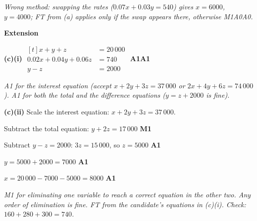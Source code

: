 \documentclass[12pt, twoside]{article}
\begin{document}
\begin{enumerate}[itemsep=0.3cm]
\emph{Wrong method: swapping the rates ($0.07x + 0.03y = 540$) gives
$x = 6000$, $y = 4000$; FT from (a) applies only if the swap appears
there, otherwise M1A0A0.}

\textbf{Extension}

\textbf{(c)(i)} \quad
$\begin{aligned}[t]
x + y + z &= 20\,000 \\
0.02x + 0.04y + 0.06z &= 740 \\
y - z &= 2000
\end{aligned}$
\hfill \textbf{A1A1}

\emph{A1 for the interest equation (accept $x + 2y + 3z = 37\,000$ or
$2x + 4y + 6z = 74\,000$). A1 for both the total and the difference
equations ($y = z + 2000$ is fine).}

\textbf{(c)(ii)} Scale the interest equation: $x + 2y + 3z = 37\,000$.

Subtract the total equation: $y + 2z = 17\,000$ \hfill \textbf{M1}

Subtract $y - z = 2000$: $3z = 15\,000$, so $z = 5000$ \hfill \textbf{A1}

$y = 5000 + 2000 = 7000$ \hfill \textbf{A1}

$x = 20\,000 - 7000 - 5000 = 8000$ \hfill \textbf{A1}

\emph{M1 for eliminating one variable to reach a correct equation in the
other two. Any order of elimination is fine. FT from the candidate's
equations in (c)(i). Check: $160 + 280 + 300 = 740$.}

\end{enumerate}
\end{document}
